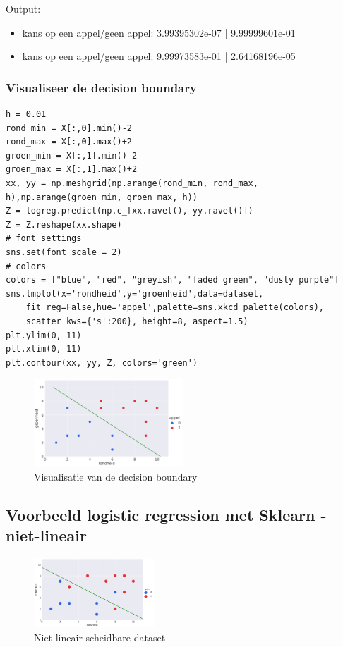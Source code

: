 \documentclass{article}
\begin{document}
Output:

\begin{itemize}
    \item kans op een appel/geen appel: 3.99395302e-07 | 9.99999601e-01
    \item kans op een appel/geen appel: 9.99973583e-01 | 2.64168196e-05
\end{itemize}

\subsubsection{Visualiseer de decision boundary}

\begin{verbatim}
h = 0.01
rond_min = X[:,0].min()-2
rond_max = X[:,0].max()+2
groen_min = X[:,1].min()-2
groen_max = X[:,1].max()+2
xx, yy = np.meshgrid(np.arange(rond_min, rond_max, h),np.arange(groen_min, groen_max, h))
Z = logreg.predict(np.c_[xx.ravel(), yy.ravel()])
Z = Z.reshape(xx.shape)
# font settings
sns.set(font_scale = 2)
# colors
colors = ["blue", "red", "greyish", "faded green", "dusty purple"]
sns.lmplot(x='rondheid',y='groenheid',data=dataset,
    fit_reg=False,hue='appel',palette=sns.xkcd_palette(colors),
    scatter_kws={'s':200}, height=8, aspect=1.5)
plt.ylim(0, 11)
plt.xlim(0, 11)
plt.contour(xx, yy, Z, colors='green')
\end{verbatim}

\begin{figure}[H]
    \centering
    \includegraphics[width=0.5\textwidth]{logistic-sklearn-decision-boundary.png}
    \caption{Visualisatie van de decision boundary}
\end{figure}

\subsection{Voorbeeld logistic regression met Sklearn - niet-lineair}

\begin{figure}[H]
    \centering
    \includegraphics[width=0.4\textwidth]{logistic-non-linear.png}
    \caption{Niet-lineair scheidbare dataset}
\end{figure}
\end{document}
